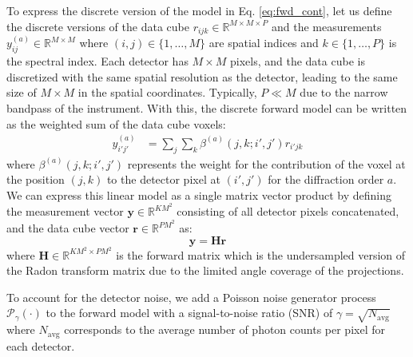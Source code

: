 \documentclass[linenumbers,twocolumn]{aastex7}
\begin{document}
To express the discrete version of the model in Eq. \eqref{eq:fwd_cont}, let us
define the discrete versions of the data cube $r_{ijk} \in \mathbb R^{M \times M
\times P}$ and the measurements $y^{(a)}_{ij} \in \mathbb R^{M \times M}$
where $(i,j) \in \{1,\dots,M\}$ are spatial indices and $k \in \{1,\dots,P\}$ is
the spectral index. Each detector has $M \times M$ pixels, and the data cube is 
discretized with the same spatial resolution as the detector, leading to the
same size of $M \times M$ in the spatial coordinates. Typically, $P \ll M$ due 
to the narrow bandpass of the instrument. With this, the discrete forward model 
can be written as the weighted sum of the data cube voxels:
\begin{align}
    y^{(a)}_{i'j'} & = \sum_{j} \sum_{k} \beta^{(a)}(j, k;i', j') r_{i'jk}
\label{eq:fwd_sum}
\end{align}
where $\beta^{(a)}(j, k;i', j')$ represents the weight for the contribution of the
voxel at the position $(j,k)$ to the detector pixel at $(i',j')$ for the
diffraction order $a$.
We can express this linear model as a single matrix vector product by defining 
the measurement vector $\bm y \in \mathbb R^{KM^2}$ consisting of all detector 
pixels concatenated, and the data cube vector $\bm r \in \mathbb R^{PM^2}$ as:
\begin{equation}
    \bm y = \bm H \bm r
\end{equation}
where $\bm H \in \mathbb R^{KM^2 \times PM^2}$ is the forward matrix 
which is the undersampled version of the Radon transform matrix due to the
limited angle coverage of the projections.

To account for the detector noise, we add a Poisson noise generator process
$\mathcal P_\gamma(\cdot)$ to the forward model with a signal-to-noise
ratio (SNR) of $\gamma = \sqrt{N_{\text{avg}}}$ where $N_{\text{avg}}$
corresponds to the average number of photon counts per pixel for each detector.


\end{document}

